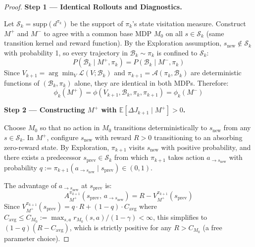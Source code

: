 \documentclass{article}
\begin{document}
\begin{proof}
\textbf{Step 1 — Identical Rollouts and Diagnostics.}

Let $\mathcal{S}_k = \text{supp}(d^{\pi_k})$ be the support of $\pi_k$'s state visitation measure. Construct $M^+$ and $M^-$ to agree with a common base MDP $M_0$ on all $s \in \mathcal{S}_k$ (same transition kernel and reward function). By the Exploration assumption, $s_{\text{new}} \notin \mathcal{S}_k$ with probability 1, so every trajectory in $\mathcal{B}_k \sim \pi_k$ is confined to $\mathcal{S}_k$:
\[
P(\mathcal{B}_k \mid M^+, \pi_k) = P(\mathcal{B}_k \mid M^-, \pi_k)
\]
Since $V_{k+1} = \arg\min_V \mathcal{L}(V;\mathcal{B}_k)$ and $\pi_{k+1} = \mathcal{A}(\pi_k, \mathcal{B}_k)$ are deterministic functions of $(\mathcal{B}_k, \pi_k)$ alone, they are identical in both MDPs. Therefore:
\begin{equation}
\phi_k(M^+) = \phi(V_{k+1}, \mathcal{B}_k, \pi_k, \pi_{k+1}) = \phi_k(M^-) \tag{$\star$}
\label{eq:star-proof}
\end{equation}

\textbf{Step 2 — Constructing $M^+$ with $\mathbb{E}[\Delta J_{k+1} \mid M^+] > 0$.}

Choose $M_0$ so that no action in $M_0$ transitions deterministically to $s_{\text{new}}$ from any $s \in \mathcal{S}_k$. In $M^+$, configure $s_{\text{new}}$ with reward $R > 0$ transitioning to an absorbing zero-reward state. By Exploration, $\pi_{k+1}$ visits $s_{\text{new}}$ with positive probability, and there exists a predecessor $s_{\text{prev}} \in \mathcal{S}_k$ from which $\pi_{k+1}$ takes action $a_{\to s_{\text{new}}}$ with probability $q := \pi_{k+1}(a_{\to s_{\text{new}}} \mid s_{\text{prev}}) \in (0, 1)$.

The advantage of $a_{\to s_{\text{new}}}$ at $s_{\text{prev}}$ is:
\[
A^{\pi_{k+1}}_{M^+}(s_{\text{prev}},\, a_{\to s_{\text{new}}}) = R - V^{\pi_{k+1}}_{M^+}(s_{\text{prev}})
\]
Since $V^{\pi_{k+1}}_{M^+}(s_{\text{prev}}) = q \cdot R + (1-q)\cdot C_{\text{avg}}$ where $C_{\text{avg}} \leq C_{M_0} := \max_{s,a} r_{M_0}(s,a)/(1-\gamma) < \infty$, this simplifies to $(1-q)(R - C_{\text{avg}})$, which is strictly positive for any $R > C_{M_0}$ (a free parameter choice).


\end{proof}
\end{document}
